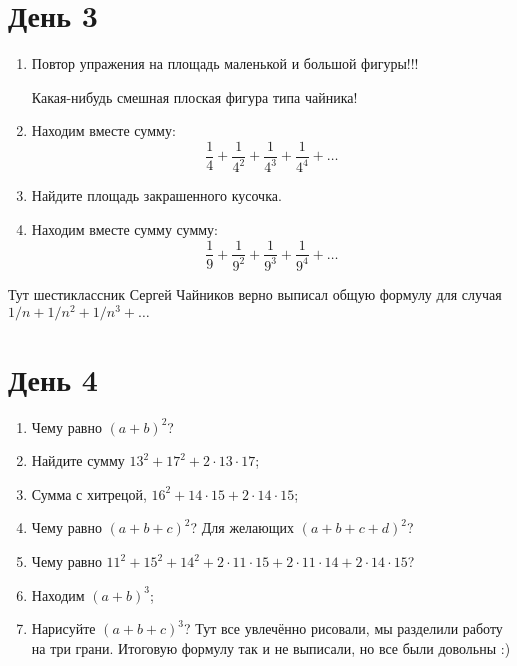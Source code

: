 \documentclass[a4paper, 12pt]{article}
\begin{document}
\section{День 3}

\begin{enumerate}

  \item Повтор упражения на площадь маленькой и большой фигуры!!!

    Какая-нибудь смешная плоская фигура типа чайника!


\item Находим вместе сумму:
\[
  \frac{1}{4} + \frac{1}{4^2} + \frac{1}{4^3} + \frac{1}{4^4} + \ldots
\]



  \item Найдите площадь закрашенного кусочка.  




    \vspace{5cm}




\item Находим вместе сумму сумму:
\[
  \frac{1}{9} + \frac{1}{9^2} + \frac{1}{9^3} + \frac{1}{9^4} + \ldots
\]
\end{enumerate}

Тут шестиклассник Сергей Чайников верно выписал общую формулу для случая $1/n+1/n^2 +1/n^3 + \ldots$


\section{День 4}

\begin{enumerate}
  \item Чему равно $(a+b)^2$?
  \item Найдите сумму $13^2 + 17^2 + 2\cdot 13\cdot 17$;
  \item Сумма с хитрецой, $16^2 + 14\cdot 15 + 2 \cdot 14\cdot 15$;
  \item Чему равно $(a+b+c)^2$? Для желающих $(a+b+c+d)^2$?
  \item Чему равно $11^2+15^2+14^2+2\cdot 11\cdot 15+2\cdot 11\cdot 14+2\cdot 14\cdot 15$?
  \item Находим $(a+b)^3$;
  \item Нарисуйте $(a+b+c)^3$? Тут все увлечённо рисовали, мы разделили работу на три грани. Итоговую формулу так и не выписали, но все были довольны :)


  \end{enumerate}
\end{document}
